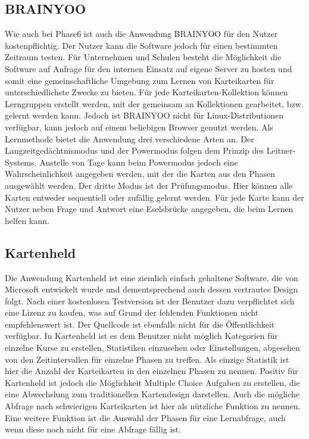 \subsection{BRAINYOO}
Wie auch bei Phase6 ist auch die Anwendung BRAINYOO \cite{brainyoo} für den Nutzer kostenpflichtig. Der Nutzer kann die Software jedoch für einen bestimmten Zeitraum testen. Für Unternehmen und Schulen besteht die Möglichkeit die Software auf Anfrage für den internen Einsatz auf eigene Server zu hosten und somit eine gemeinschaftliche Umgebung zum Lernen von Karteikarten für unterschiedlichste Zwecke zu bieten. Für jede Karteikarten-Kollektion können Lerngruppen erstellt werden, mit der gemeinsam an Kollektionen gearbeitet, bzw. gelernt werden kann. Jedoch ist BRAINYOO nicht für Linux-Distributionen verfügbar, kann jedoch auf einem beliebigen Browser genutzt werden. Als Lernmethode bietet die Anwendung drei verschiedene Arten an. Der Langzeitgedächtnismodus und der Powermodus folgen dem Prinzip des Leitner-Systems. Anstelle von Tage kann beim Powermodus jedoch eine Wahrscheinlichkeit angegeben werden, mit der die Karten aus den Phasen ausgewählt werden. Der dritte Modus ist der Prüfungsmodus. Hier können alle Karten entweder sequentiell oder zufällig gelernt werden.
Für jede Karte kann der Nutzer neben Frage und Antwort eine Eselsbrücke angegeben, die beim Lernen helfen kann.

\subsection{Kartenheld}
Die Anwendung Kartenheld \cite{kartenheld} ist eine ziemlich einfach gehaltene Software, die von Microsoft entwickelt wurde und dementsprechend auch dessen vertrautes Design folgt. Nach einer kostenlosen Testversion ist der Benutzer dazu verpflichtet sich eine Lizenz zu kaufen, was auf Grund der fehlenden Funktionen nicht empfehlenswert ist. Der Quellcode ist ebenfalls nicht für die Öffentlichkeit verfügbar. In Kartenheld ist es dem Benutzer nicht möglich Kategorien für einzelne Kurse zu erstellen, Statistiken einzusehen oder Einstellungen, abgesehen von den Zeitintervallen für einzelne Phasen zu treffen. Als einzige Statistik ist hier die Anzahl der Karteikarten in den einzelnen Phasen zu nennen. Positiv für Kartenheld ist jedoch die Möglichkeit Multiple Choice Aufgaben zu erstellen, die eine Abwechslung zum traditionellen Kartendesign darstellen. Auch die mögliche Abfrage nach schwierigen Karteikarten ist hier als nützliche Funktion zu nennen. Eine weitere Funktion ist die Auswahl der Phasen für eine Lernabfrage, auch wenn diese noch nicht für eine Abfrage fällig ist.

